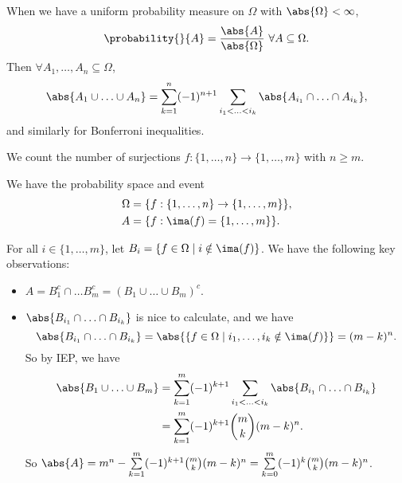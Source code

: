 When we have a uniform probability measure on \(\Omega\) with \(\abs{\Omega} < \infty\),
\[
    \probability{}{A} =\frac{\abs{A}}{\abs{\Omega} }~\forall A \subseteq \Omega.
\]
Then \(\forall A_1, \ldots, A_n \subseteq \Omega \),
\[
    \abs{A_1 \cup \ldots \cup A_n} = \sum\limits_{k=1}^{n} (-1)^{n+1}\sum\limits_{i_1< \ldots < i_k }\abs{A_{i_1}\cap \ldots \cap A_{i_k} },
\]
and similarly for Bonferroni inequalities.

\begin{example}
    We count the number of surjections \(f: \{1, \ldots, n\}\to \{1, \ldots ,m \}\) with \(n \geq m\).

    We have the probability space and event
    \begin{align*}
        \Omega &= \{f:\{1, \ldots ,n\}\to \{1, \ldots , m \}\},\\
        A &= \{f: \ima(f) = \{1, \ldots , m \}\}.
    \end{align*}

    For all \(i \in \{1, \ldots ,m \}\), let \(B_i = \{f\in \Omega\mid i \notin \ima(f)\}\). We have the following key observations:
    \begin{itemize}
        \item \(A = B_1^c \cap \ldots B_m^c = (B_1 \cup \ldots \cup B_m )^c \).
        \item \(\abs{B_{i_1}\cap \ldots \cap B_{i_k}} \) is nice to calculate, and we have
        \[
            \abs{B_{i_1}\cap \ldots \cap B_{i_k} } = \abs{\{f\in \Omega\mid i_1, \ldots, i_k \notin \ima(f) \}} = (m-k)^n.
        \]
        So by IEP, we have 
        \begin{align*}
            \abs{B_1 \cup \ldots \cup B_m} &= \sum\limits_{k=1}^{m} (-1)^{k+1}\sum\limits_{i_1<\ldots<i_{k}} \abs{B_{i_1}\cap \ldots \cap B_{i_k}}\\
            &= \sum\limits_{k=1}^{m} (-1)^{k+1} \binom{m}{k}(m-k)^n.
        \end{align*}
        So \(\abs{A} = m^n - \sum\limits_{k=1}^{m} (-1)^{k+1}\binom{m}{k}(m-k)^n = \sum\limits_{k=0}^{m} (-1)^k \binom{m}{k}(m-k)^n\).
    \end{itemize}
\end{example}
